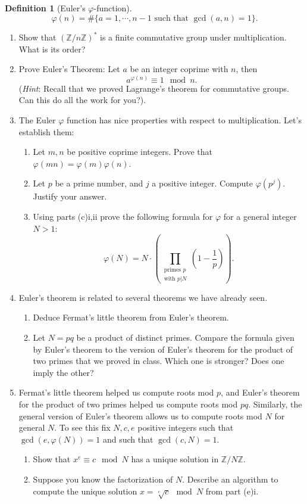 \documentclass[11pt]{article}
\newtheorem{definition}{Definition}
\newcommand{\bZ}{\mathbb{Z}}
\begin{document}
\begin{enumerate}
{\begin{definition}[Euler's $\varphi$-function]
    \[\varphi(n) = \#\{a = 1,\cdots,n-1\text{ such that }\gcd(a,n) = 1\}.\]
  \end{definition}
  \begin{enumerate}
    \item{
    Show that $(\bZ/n\bZ)^*$ is a finite commutative group under multiplication.  What is its order?
    }
    \item{
    Prove Euler's Theorem: Let $a$ be an integer coprime with $n$, then
    \[a^{\varphi(n)}\equiv1\mod n.\]
    (\textit{Hint}: Recall that we proved Lagrange's theorem for commutative groups.  Can this do all the work for you?).
    }
    \item{The Euler $\varphi$ function has nice properties with respect to multiplication.  Let's establish them:
    \begin{enumerate}
      \item{
      Let $m,n$ be positive coprime integers.  Prove that $\varphi(mn)=\varphi(m)\varphi(n)$.
      }
      \item{
      Let $p$ be a prime number, and $j$ a positive integer.  Compute $\varphi(p^j)$.  Justify your answer.
      }
      \item{
      Using parts (c)i,ii prove the following formula for $\varphi$ for a general integer $N>1$:
      \[\varphi(N) = N\cdot\left(\prod_{\substack{\text{primes }p\\ \text{with }p|N}}\left(1-\frac{1}{p}\right)\right).\]
      }
    \end{enumerate}
    }
    \item{
    Euler's theorem is related to several theorems we have already seen.
    \begin{enumerate}
      \item{
      Deduce Fermat's little theorem from Euler's theorem.
      }
      \item{
      Let $N=pq$ be a product of distinct primes.  Compare the formula given by Euler's theorem to the version of Euler's theorem for the product of two primes that we proved in class.  Which one is stronger?  Does one imply the other?
      }
    \end{enumerate}
    }
    \item{
    Fermat's little theorem helped us compute roots mod $p$, and Euler's theorem for the product of two primes helped us compute roots mod $pq$.  Similarly, the general version of Euler's theorem allows us to compute roots mod $N$ for general $N$.  To see this fix $N,c,e$ positive integers such that $\gcd(e,\varphi(N)) = 1$ and such that $\gcd(c,N)=1$.
    \begin{enumerate}
      \item{
      Show that $x^e\equiv c\mod N$ has a unique solution in $\bZ/N\bZ$.
      }
      \item{
      Suppose you know the factorization of $N$.  Describe an algorithm to compute the unique solution $x = \sqrt[e]{c}\mod N$ from part (e)i.
      }
    \end{enumerate}
    }
  \end{enumerate}
  }
\end{enumerate}
\end{document}
